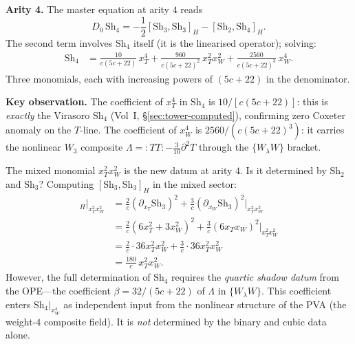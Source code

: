 \documentclass[11pt]{article}
\newcommand{\normord}[1]{:\!#1\!:}
\begin{document}
\medskip
\noindent\textbf{Arity 4.}  The master equation at arity $4$
reads
\[
D_0\,\mathrm{Sh}_4
= -\frac{1}{2}[\mathrm{Sh}_3, \mathrm{Sh}_3]_H
  - [\mathrm{Sh}_2, \mathrm{Sh}_4]_H.
\]
The second term involves $\mathrm{Sh}_4$ itself (it is the
linearised operator); solving:
\begin{align*}
\mathrm{Sh}_4
&= \frac{10}{c(5c{+}22)}\,x_T^4
+ \frac{960}{c(5c{+}22)^2}\,x_T^2 x_W^2
+ \frac{2560}{c(5c{+}22)^3}\,x_W^4.
\end{align*}
Three monomials, each with increasing powers of $(5c{+}22)$ in
the denominator.

\medskip
\noindent\textbf{Key observation.}  The coefficient of $x_T^4$
in $\mathrm{Sh}_4$ is $10/[c(5c{+}22)]$: this is
\emph{exactly} the Virasoro $\mathrm{Sh}_4$ (Vol~I,
\S\ref{sec:tower-computed}), confirming zero Coxeter anomaly on
the $T$-line.  The coefficient of $x_W^4$ is
$2560/(c(5c{+}22)^3)$: it carries the nonlinear $W_3$
composite $\Lambda = \normord{TT} - \frac{3}{10}\partial^2 T$
through the $\{W_\lambda W\}$ bracket.

The mixed monomial $x_T^2 x_W^2$ is the new datum at arity $4$.
Is it determined by $\mathrm{Sh}_2$ and $\mathrm{Sh}_3$?
Computing $[\mathrm{Sh}_3, \mathrm{Sh}_3]_H$ in the mixed sector:
\begin{align*}
[\mathrm{Sh}_3, \mathrm{Sh}_3]_H \big|_{x_T^2 x_W^2}
&= \frac{2}{c}(\partial_{x_T}\mathrm{Sh}_3)^2
   + \frac{3}{c}(\partial_{x_W}\mathrm{Sh}_3)^2
   \bigg|_{x_T^2 x_W^2}
\\
&= \frac{2}{c}(6x_T^2 + 3x_W^2)^2
   + \frac{3}{c}(6x_T x_W)^2
   \bigg|_{x_T^2 x_W^2}
\\
&= \frac{2}{c}\cdot 36 x_T^2 x_W^2
   + \frac{3}{c}\cdot 36 x_T^2 x_W^2
\\
&= \frac{180}{c}\,x_T^2 x_W^2.
\end{align*}
However, the full determination of $\mathrm{Sh}_4$ requires the
\emph{quartic shadow datum} from the OPE---the coefficient
$\beta = 32/(5c+22)$ of $\Lambda$ in $\{W_\lambda W\}$.  This
coefficient enters $\mathrm{Sh}_4|_{x_W^4}$ as independent input
from the nonlinear structure of the PVA (the weight-$4$
composite field).  It is \emph{not} determined by the binary
and cubic data alone.
\end{document}
